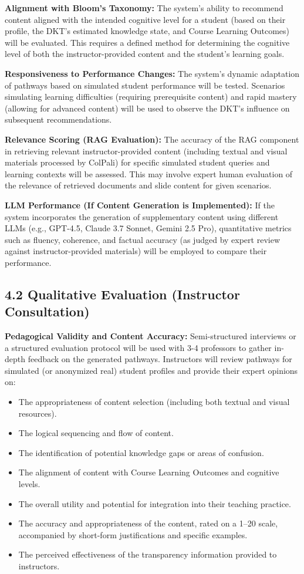 \documentclass{stylefiles/capstone}
\begin{document}
\textbf{Alignment with Bloom's Taxonomy:}  
The system's ability to recommend content aligned with the intended cognitive level for a student (based on their profile, the DKT's estimated knowledge state, and Course Learning Outcomes) will be evaluated. This requires a defined method for determining the cognitive level of both the instructor-provided content and the student's learning goals.

\textbf{Responsiveness to Performance Changes:}  
The system's dynamic adaptation of pathways based on simulated student performance will be tested. Scenarios simulating learning difficulties (requiring prerequisite content) and rapid mastery (allowing for advanced content) will be used to observe the DKT's influence on subsequent recommendations.

\textbf{Relevance Scoring (RAG Evaluation):}  
The accuracy of the RAG component in retrieving relevant instructor-provided content (including textual and visual materials processed by ColPali) for specific simulated student queries and learning contexts will be assessed. This may involve expert human evaluation of the relevance of retrieved documents and slide content for given scenarios.

\textbf{LLM Performance (If Content Generation is Implemented):}  
If the system incorporates the generation of supplementary content using different LLMs (e.g., GPT-4.5, Claude 3.7 Sonnet, Gemini 2.5 Pro), quantitative metrics such as fluency, coherence, and factual accuracy (as judged by expert review against instructor-provided materials) will be employed to compare their performance.

\subsection{4.2 Qualitative Evaluation (Instructor Consultation)}

\textbf{Pedagogical Validity and Content Accuracy:}  
Semi-structured interviews or a structured evaluation protocol will be used with 3-4 professors to gather in-depth feedback on the generated pathways. Instructors will review pathways for simulated (or anonymized real) student profiles and provide their expert opinions on:

\begin{itemize}
  \item The appropriateness of content selection (including both textual and visual resources).
  \item The logical sequencing and flow of content.
  \item The identification of potential knowledge gaps or areas of confusion.
  \item The alignment of content with Course Learning Outcomes and cognitive levels.
  \item The overall utility and potential for integration into their teaching practice.
  \item The accuracy and appropriateness of the content, rated on a 1--20 scale, accompanied by short-form justifications and specific examples.
  \item The perceived effectiveness of the transparency information provided to instructors.
\end{itemize}
\end{document}

